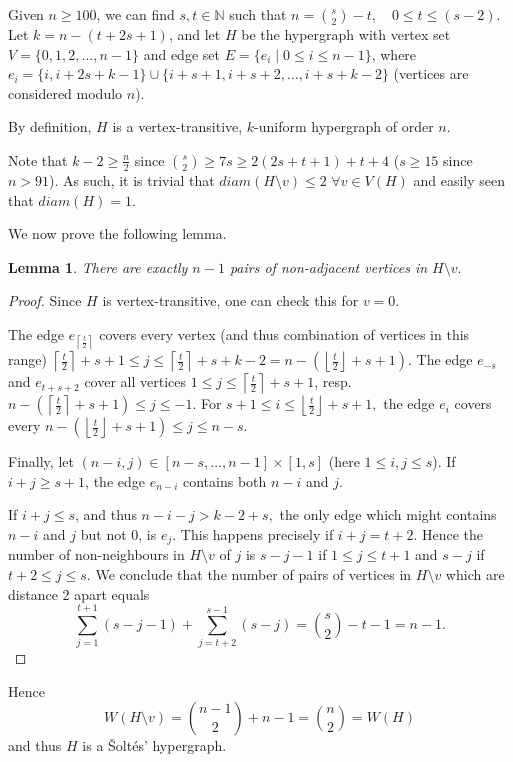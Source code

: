 \documentclass[a4paper,11pt]{article}
\newcommand*{\ceilfrac}[2]{\mathopen{}\left\lceil\frac{#1}{#2}\right\rceil\mathclose{}}
\newcommand*{\floorfrac}[2]{\mathopen{}\left\lfloor\frac{#1}{#2}\right\rfloor\mathclose{}}
\newcommand{\diam}{diam}
\newtheorem{lem}[defi]{Lemma}
\begin{document}
Given $n\geq 100$, we can find $s,t\in \mathbb{N}$ such that $n=\binom{s}{2}-t,\quad 0\leq t\leq (s-2)$.
Let $k=n-(t+2s+1)$, and let $H$ be the hypergraph with vertex set $V=\{0,1,2,...,n-1\}$ and edge set $E=\{e_i \mid 0 \le i \le n-1\}$,
where $e_i= \{ i, i+2s+k-1\} \cup \{i+s+1, i+s+2,\ldots, i+s+k-2 \}$ (vertices are considered modulo $n$).

By definition, $H$ is a vertex-transitive, $k$-uniform hypergraph of order $n$.

Note that $k-2 \ge \frac n2$ since $\binom s2 \ge 7s \ge 2(2s+t+1)+t+4$ ($s \ge 15$ since $n>91$).
As such, it is trivial that $\diam(H\setminus v) \le 2$ $\forall v\in V(H)$ and easily seen that $\diam(H)=1.$

We now prove the following lemma.

\begin{lem}
    There are exactly $n-1$ pairs of non-adjacent vertices in $H\setminus v.$
\end{lem}

\begin{proof}
    Since $H$ is vertex-transitive, one can check this for $v=0.$
    
    The edge $e_{\ceilfrac{t}{2}}$ covers every vertex (and thus combination of vertices in this range) $\ceilfrac{t}{2}+s+1 \le j \le \ceilfrac{t}{2}+s+k-2=n-(\floorfrac{t}{2}+s+1).$
    The edge $e_{-s}$ and $e_{t+s+2}$ cover all vertices $1 \le j \le \ceilfrac{t}{2}+s+1 $, resp. $ n-(\ceilfrac{t}{2}+s+1) \le j \le -1 $.
    For $s+1 \le i \le \floorfrac{t}{2}+s+1,$ the edge $e_i$ covers every $ n-( \floorfrac{t}{2}+s+1) \le j\le n-s$.

    Finally, let $(n-i,j) \in [n-s,\ldots,n-1] \times [1,s]$ (here $1 \le i,j \le s$).
    If $i+j\ge s+1$, the edge $e_{n-i}$ contains both $n-i$ and $j$.

    If $i+j \le s$, and thus $n-i-j>k-2+s,$ the only edge which might contains $n-i$ and $j$ but not $0$, is $e_j.$
    This happens precisely if $i+j=t+2.$
    Hence the number of non-neighbours in $H \setminus v$ of $j$ is $s-j-1$ if $1 \le j \le t+1$ and $s-j$ if $t+2 \le j \le s.$
    We conclude that the number of pairs of vertices in $H \setminus v$ which are distance $2$ apart equals
     $$\sum\limits_{j=1}^{t+1}(s-j-1) + \sum\limits_{j=t+2}^{s-1} (s-j)
     = \binom{s}{2}-t-1=n-1.$$
     \end{proof}
    Hence 
    $$W(H \setminus v) = \binom{n-1}2+n-1=\binom n2= W(H) $$
    and thus $H$ is a \v Solt\'es' hypergraph.
\end{document}
